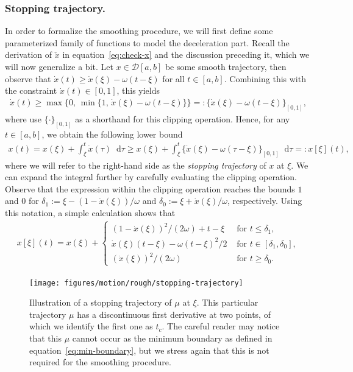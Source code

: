 \documentclass[a4paper]{article}
\theoremstyle{definition}
\theoremstyle{plain}
\newcommand*\diff{\mathop{}\!\mathrm{d}}
\begin{document}
\subsubsection{Stopping trajectory.}
In order to formalize the smoothing procedure, we will first define some
parameterized family of functions to model the deceleration part.
%
Recall the derivation of $\check{x}$ in equation~\eqref{eq:check-x} and the discussion
preceding it, which we will now generalize a bit.
%
Let $x \in \mathcal{D}[a, b]$ be some smooth trajectory, then observe that $\dot{x}(t) \geq \dot{x}(\xi) - \omega(t - \xi)$ for all $t \in [a, b]$.
Combining this with the constraint $\dot{x}(t) \in [0, 1]$, this yields
\begin{align}
  \dot{x}(t) \geq \max\{ 0, \, \min\{1, \, \dot{x}(\xi) - \omega (t - \xi) \}\} =: \{\dot{x}(\xi) - \omega(t-\xi)\}_{[0,1]} ,
\end{align}
where use $\{ \cdot \}_{[0,1]}$ as a shorthand for this clipping operation.
%
Hence, for any $t \in [a,b]$, we obtain the following lower bound
\begin{align}\label{eq:stopping-trajectory}
  x(t) = x(\xi) + \int_{\xi}^{t} \dot{x}(\tau) \diff \tau \geq x(\xi) + \int_{\xi}^{t} \{\dot{x}(\xi) - \omega(\tau - \xi)\}_{[0,1]} \diff \tau =: x[\xi] (t) ,
\end{align}
where we will refer to the right-hand side as the \emph{stopping trajectory} of $x$ at
$\xi$.
%
We can expand the integral further by carefully evaluating the clipping
operation. Observe that the expression within the clipping operation reaches the
bounds $1$ and $0$ for $\delta_{1} := \xi - (1-\dot{x}(\xi))/\omega$ and
$\delta_{0} := \xi + \dot{x}(\xi)/\omega$, respectively. Using this notation, a
simple calculation shows that
\begin{align}\label{eq:stopping-trajectory-explicit}
  x[\xi](t) = x(\xi) +
  \begin{cases}
    {(1 - \dot{x}(\xi))}^{2} / (2\omega) + t - \xi & \text{ for } t \leq \delta_{1} , \\
    \dot{x}(\xi)(t - \xi) - \omega{(t-\xi)}^{2} /2 & \text{ for } t \in [\delta_{1} , \delta_{0}] , \\
    {(\dot{x}(\xi))}^{2}/(2\omega) & \text{ for } t \geq \delta_{0} .
  \end{cases}
\end{align}

\begin{figure}
  \centering
  \texttt{[image: figures/motion/rough/stopping-trajectory]}
  \caption{Illustration of a stopping trajectory of $\mu$ at $\xi$. This
    particular trajectory $\mu$ has a discontinuous first derivative at two points, of
    which we identify the first one as $t_{c}$. The careful reader may notice
    that this $\mu$ cannot occur as the minimum boundary as defined in
    equation~\eqref{eq:min-boundary}, but we stress again that this is not
    required for the smoothing procedure.}%
  \label{fig:stopping-trajectory}
\end{figure}
\end{document}
